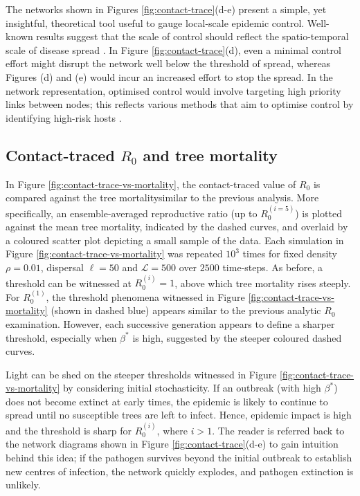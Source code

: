 The networks shown in Figures \ref{fig:contact-trace}(d-e) present a simple, yet insightful, theoretical tool useful to gauge local-scale epidemic control.
Well-known results suggest that the scale of control should reflect the spatio-temporal scale of disease spread \cite{control-scale-matching}.
In Figure \ref{fig:contact-trace}(d), even a minimal control effort might disrupt the network well below the threshold of spread,
whereas Figures (d) and (e) would incur an increased effort to stop the spread.
In the network representation, optimised control would involve targeting high priority links between nodes;
this reflects various methods that aim to optimise control by identifying high-risk hosts \cite{surveillance-review, risk-potential-control, doi:10.1094/PHYTO-100-7-0638}.

\newpage

\subsection{Contact-traced $R_0$ and tree mortality}

In Figure \ref{fig:contact-trace-vs-mortality}, the contact-traced value of $R_0$ is compared against the tree mortality\textemdash similar to the previous analysis.
More specifically, an ensemble-averaged reproductive ratio (up to $R_0^{(i=5)}$) is plotted against the mean tree mortality, indicated by the dashed curves, and overlaid by a coloured scatter plot depicting a small sample of the data.
Each simulation in Figure \ref{fig:contact-trace-vs-mortality} was repeated $10^3$ times for fixed density $\rho=0.01$, dispersal $\ell=50$ and $\mathcal{L}=500$ over $2500$ time-steps.
As before, a threshold can be witnessed at $R_0^{(i)}=1$, above which tree mortality rises steeply.
For $R_0^{(1)}$, the threshold phenomena witnessed in Figure \ref{fig:contact-trace-vs-mortality} (shown in dashed blue) appears similar to the previous analytic $R_0$ examination.
However, each successive generation appears to define a sharper threshold, especially when $\beta^*$ is high, suggested by the steeper coloured dashed curves.

Light can be shed on the steeper thresholds witnessed in Figure \ref{fig:contact-trace-vs-mortality} 
by considering initial stochasticity.
If an outbreak (with high $\beta^*$) does not become extinct at early times, the epidemic is likely to continue to spread until no susceptible trees are left to infect.
Hence, epidemic impact is high and the threshold is sharp for $R_0^{(i)}$, where $i > 1$. 
The reader is referred back to the network diagrams shown in Figure \ref{fig:contact-trace}(d-e) to gain intuition behind this idea;
if the pathogen survives beyond the initial outbreak to establish new centres of infection, the network quickly explodes, and pathogen extinction is unlikely.

